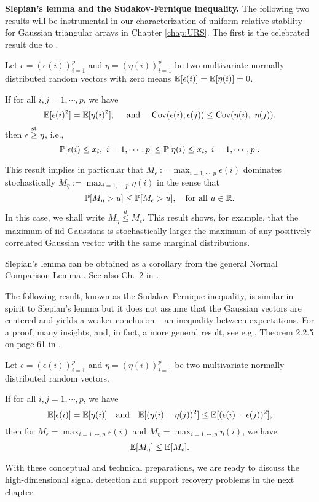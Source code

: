 {\bf Slepian's lemma and the Sudakov-Fernique inequality.} 
The following two results will be instrumental in our characterization of uniform relative stability for 
Gaussian triangular arrays in Chapter \ref{chap:URS}.  
The first is the celebrated result due to \citet{slepian1962one}.

\begin{theorem}\label{thm:Slepian-lemma} Let $\epsilon = (\epsilon(i))_{i=1}^p$ and $\eta = (\eta(i))_{i=1}^p$ be 
two multivariate normally distributed random vectors with zero means $\E [\epsilon(i)] = \E[\eta(i)] = 0$. 

 If for all $i,j=1,\cdots,p$, we have
$$
\E [\epsilon(i)^2] = \E[\eta(i)^2],\ \ \ \mbox{ and }\ \ \ {\rm Cov}(\epsilon(i),\epsilon(j)) \le {\rm Cov}(\eta(i),\ \eta(j)),
$$
 then $\epsilon \stackrel{{\rm st}}{\ge} \eta$, i.e.,
$$
\P [ \epsilon(i) \le x_i,\ i=1,\cdots,p] \le \P [ \eta(i) \le x_i,\ i=1,\cdots,p].
$$
\end{theorem}


This result implies in particular that $M_\epsilon:= \max_{i=1,\cdots,p}\epsilon(i)$ dominates stochastically $M_\eta:= \max_{i=1,\cdots,p} \eta(i)$ in the
sense that
\begin{equation}\label{e:Slepian-lemma-maxima}
 \P[ M_\eta > u] \le \P [M_\epsilon > u],\ \ \mbox{ for all }u\in\mathbb R.
\end{equation}
In this case, we shall write $M_\eta \stackrel{d}{\le} M_\epsilon$.  This result shows, for example, that the maximum of iid Gaussians is 
stochastically larger the maximum of any positively correlated Gaussian vector with the same marginal distributions. 

Slepian's lemma can be obtained as a corollary from the general Normal Comparison Lemma 
\citep[see, e.g., Theorem 4.2.1 on page 81 in][]{leadbetter2012extremes}.  See also Ch.\ 2 in \cite{adler2009random}.

The following result, known as the Sudakov-Fernique inequality, is similar in spirit to Slepian's lemma but it does not assume that the Gaussian 
vectors are centered and yields a weaker conclusion -- an inequality between expectations. For a proof, many insights, and, in fact, a more 
general result, see e.g., Theorem 2.2.5 on page 61 in \cite{adler2009random}.

\begin{theorem}  \label{th:Sudakov-Fernique} 
Let $\epsilon = (\epsilon(i))_{i=1}^p$ and $\eta = (\eta(i))_{i=1}^p$ be 
two multivariate normally distributed random vectors.

If for all $i,j=1,\cdots,p$, we have 
$$
\E [ \epsilon(i) ] = \E [\eta(i)] \ \ \mbox{ and }\ \ \E [ (\eta(i)-\eta(j))^2] \le \E [ (\epsilon(i)-\epsilon(j))^2],
$$
then for $M_\epsilon = \max_{i=1,\cdots,p}\epsilon(i)$ and $M_\eta = \max_{i=1,\cdots,p} \eta(i)$, we have 
$$
 \E [ M_\eta ] \le \E [M_\epsilon].
$$
\end{theorem}

With these conceptual and technical preparations, we are ready to discuss the high-dimensional signal detection and support recovery problems in the next chapter.


